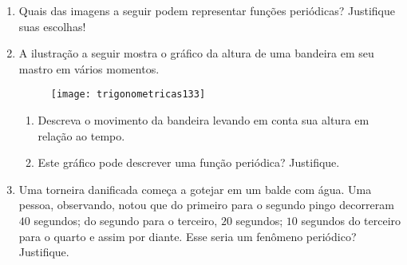 \begin{enumerate}
\item Quais das imagens a seguir podem representar funções periódicas? Justifique suas escolhas!
\begin{enumerate}
\end{enumerate}


\item A ilustração a seguir mostra o gráfico da altura de uma bandeira em seu mastro em vários momentos.
\begin{figure}[H]
\centering

\texttt{[image: trigonometricas133]}
\end{figure}
\begin{enumerate}
\item Descreva o movimento da bandeira levando em conta sua altura em relação ao tempo.
\item Este gráfico pode descrever uma função periódica? Justifique.
\end{enumerate}


\item Uma torneira danificada começa a gotejar em um balde com água. Uma pessoa, observando, notou que do primeiro para o segundo pingo decorreram $40$ segundos; do segundo para o terceiro, $20$ segundos; $10$ segundos do terceiro para o quarto e assim por diante. Esse seria um fenômeno periódico? Justifique.



\end{enumerate}
